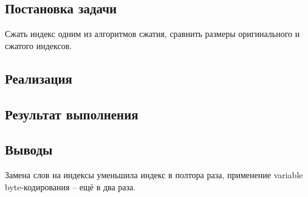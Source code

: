 \documentclass[a4paper, 12pt]{article}
\begin{document}

\newpage


\subsection*{Постановка задачи}
Сжать индекс одним из алгоритмов сжатия, сравнить размеры оригинального и сжатого индексов.

\subsection*{Реализация}



\subsection*{Результат выполнения}



\subsection*{Выводы}
Замена слов на индексы уменьшила индекс в полтора раза, применение variable byte-кодирования -- ещё в два раза.
\end{document}
